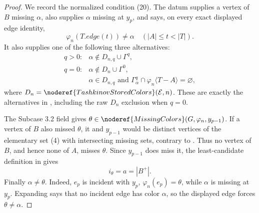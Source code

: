 \begin{proof}
We record the normalized condition (20).  The datum supplies a vertex of
\(B\) missing \(\alpha\), also supplies \(\alpha\) missing at \(y_p\),
and says, on every exact displayed edge identity,
\[
       \varphi_n(T.\mathit{edge}(t))\ne\alpha
                         \quad(|A|\leq t<|T|).                 \tag{5}
\]
It also supplies one of the following three alternatives:
\[
\begin{array}{ll}
q>0:&\alpha\notin D_{n,q}\cup\Gamma^q,\\
q=0:&\alpha\notin D_n\cup\Gamma^0,\\
&\alpha\in D_{n,q}\text{ and }
  \Gamma^q_\alpha\cap\varphi_n\langle T-A\rangle=\varnothing,
\end{array}                                                    \tag{6}
\]
where \(D_n=\noderef{TashkinovStoredColors}(\mathcal E,n)\).  These are
exactly the alternatives in
, including the
raw \(D_n\) exclusion when \(q=0\).

The Subcase 3.2 field gives
\(\theta\in\noderef{MissingColors}(G,\varphi_n,y_{p-1})\).  If a vertex
of \(B\) also missed \(\theta\), it and \(y_{p-1}\) would be distinct
vertices of the elementary set (4) with intersecting missing sets,
contrary to .  Thus no vertex of
\(B\), and hence none of \(A\), misses \(\theta\).  Since
\(y_{p-1}\) does miss it, the least-candidate definition in
 gives
\[
 i_\theta=a=|B^+|.                                           \tag{7}
\]
Finally \(\alpha\ne\theta\).  Indeed, \(e_p\) is incident with \(y_p\),
\(\varphi_n(e_p)=\theta\), while \(\alpha\) is missing at \(y_p\).
Expanding  says that no incident edge has color
\(\alpha\), so the displayed edge forces \(\theta\ne\alpha\).


\end{proof}
